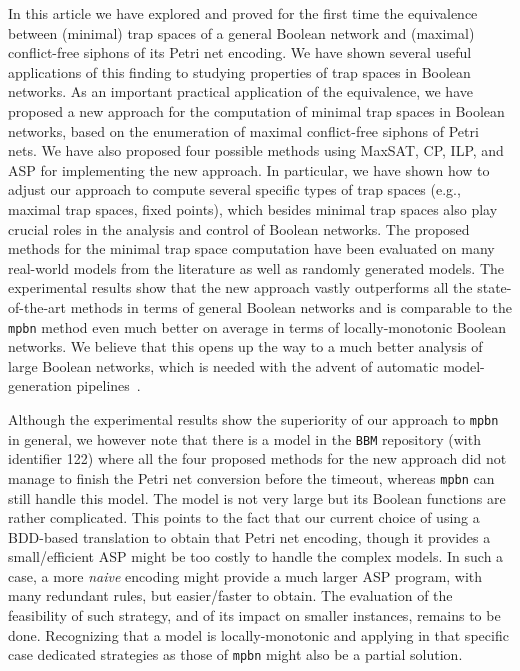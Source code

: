 \documentclass[preprint,12pt]{elsarticle}
\begin{document}
In this article we have explored and proved for the first time the equivalence between (minimal) trap spaces of a general Boolean network and (maximal) conflict-free siphons of its Petri net encoding.
We have shown several useful applications of this finding to studying properties of trap spaces in Boolean networks.
As an important practical application of the equivalence, we have proposed a new approach for the computation of minimal trap spaces in Boolean networks, based on the enumeration of maximal conflict-free siphons of Petri nets.
We have also proposed four possible methods using MaxSAT, CP, ILP, and ASP for implementing the new approach.
In particular, we have shown how to adjust our approach to compute several specific types of trap spaces (e.g., maximal trap spaces, fixed points), which besides minimal trap spaces also play crucial roles in the analysis and control of Boolean networks.
The proposed methods for the minimal trap space computation have been evaluated on many real-world models from the literature as well as randomly generated models.
The experimental results show that the new approach vastly outperforms all the state-of-the-art methods in terms of general Boolean networks and is comparable to the \texttt{mpbn} method even much better on average in terms of locally-monotonic Boolean networks.
We believe that this opens up the way to a much better analysis of large Boolean networks, which is needed with the advent of automatic model-generation pipelines~\cite{ostaszewski2021covid19}.

Although the experimental results show the superiority of our approach to \texttt{mpbn} in general, we however note that there is a model in the \texttt{BBM} repository (with identifier 122) where all the four proposed methods for the new approach did not manage to finish the Petri net conversion before the timeout, whereas \texttt{mpbn} can still handle this model.
The model is not very large but its Boolean functions are rather complicated.
This points to the fact that our current choice of using a BDD-based translation to obtain that Petri net encoding, though it provides a small/efficient ASP might be too costly to handle the complex models.
In such a case, a more \emph{naive} encoding might provide a much larger ASP program, with many redundant rules, but easier/faster to obtain.
The evaluation of the feasibility of such strategy, and of its impact on smaller instances, remains to be done.
Recognizing that a model is locally-monotonic and applying in that specific case dedicated strategies as those of \texttt{mpbn} might also be a partial solution.
\end{document}
